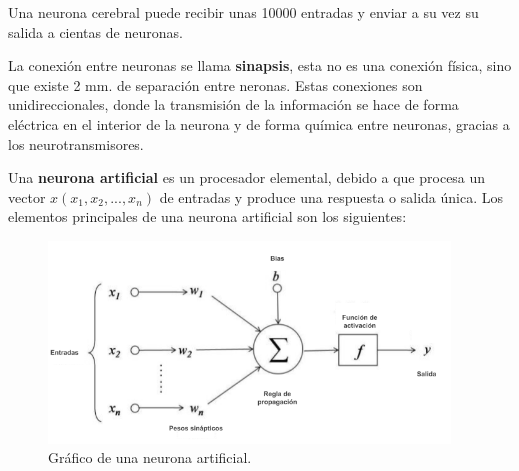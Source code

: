 Una neurona cerebral puede recibir unas 10000 entradas y enviar a su vez su salida a cientas de neuronas.

\vspace{5mm} %

La conexi\'{o}n entre neuronas se llama \textbf{sinapsis}, esta no es una conexi\'{o}n f\'{i}sica, sino que existe 2 mm. de separaci\'{o}n entre neronas. Estas conexiones son unidireccionales, donde la transmisi\'{o}n de la informaci\'{o}n se hace de forma el\'{e}ctrica en el interior de la neurona  y de forma qu\'{i}mica entre neuronas, gracias a los neurotransmisores.

\vspace{5mm} %

Una \textbf{neurona artificial} es un procesador elemental, debido a que procesa un vector $x(x_{1},x_{2}, ... ,x_{n})$ de entradas y produce una respuesta o salida \'{u}nica. Los elementos principales de una neurona artificial son los siguientes:

\begin{figure}[h!]
  \begin{center}	\includegraphics[width=0.95\textwidth]{imagenes/Cap4/neurona_artificial}
  \caption{Gr\'{a}fico de una neurona artificial.}
  \label{fig:neurona}
  \end{center}
\end{figure}

